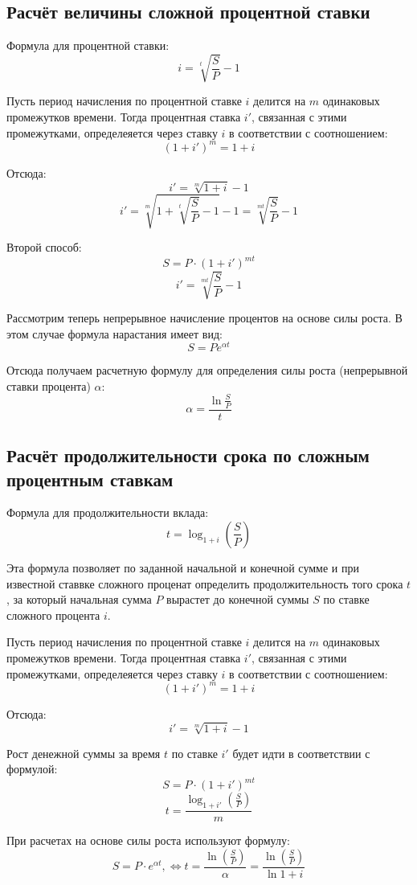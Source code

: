 \documentclass[aps,%
12pt,%
final,%
oneside,
onecolumn,%
musixtex, %
superscriptaddress,%
centertags]{article} %
\theoremstyle{plain}
\theoremstyle{definition}
\theoremstyle{remark}
\begin{document}
\subsection{Расчёт величины сложной процентной ставки}

Формула для процентной ставки: $$i=\sqrt[t]{\frac{S}{P}}-1$$

Пусть период начисления по процентной ставке $i$ делится на $m$ одинаковых промежутков времени. Тогда процентная ставка $i'$, связанная с этими промежутками, определеяется через ставку $i$ в соответствии с соотношением:
$$(1+i')^m = 1+i$$

Отсюда:
$$i' = \sqrt[m]{1+i} - 1$$
$$i' = \sqrt[m]{1+\sqrt[t]{\frac{S}{P}}-1}-1 = \sqrt[mt]{\frac{S}{P}} - 1$$

Второй способ:
$$S = P \cdot (1+i')^{mt}$$
$$i' = \sqrt[mt]{\frac{S}{P}} - 1$$

Рассмотрим теперь непрерывное начисление процентов на основе силы роста. В этом случае формула нарастания имеет вид:
$$S = Pe^{\alpha t}$$

Отсюда получаем расчетную формулу для определения силы роста (непрерывной ставки процента) $\alpha$:
$$\alpha = \frac{\ln \frac{S}{P}}{t}$$


\subsection{Расчёт продолжительности срока по сложным процентным ставкам }

Формула для продолжительности вклада:
$$ t = \log_{1+i}\left({\frac{S}{P}}\right)$$

Эта формула позволяет по заданной начальной и конечной сумме и при известной ставвке сложного проценат определить продолжительность того срока $t$, за который начальная сумма $P$ вырастет до конечной суммы $S$ по ставке сложного процента $i$.

Пусть период начисления по процентной ставке $i$ делится на $m$ одинаковых промежутков времени. Тогда процентная ставка $i'$, связанная с этими промежутками, определеяется через ставку $i$ в соответствии с соотношением:
$$(1+i')^m = 1+i$$

Отсюда:
$$i' = \sqrt[m]{1+i} - 1$$

Рост денежной суммы за время $t$ по ставке $i'$ будет идти в соответствии с формулой:
$$S = P \cdot (1+i')^{mt}$$
$$t = \frac{\log_{1+i'} \left({\frac{S}{P}}\right)}{m}$$

При расчетах на основе силы роста используют формулу:
$$S = P\cdot e^{\alpha t}, \Leftrightarrow t = \frac{\ln {\left(\frac{S}{P}\right)}}{\alpha} =  \frac{\ln {\left(\frac{S}{P}\right)}}{\ln{1+i}} $$
\end{document}
